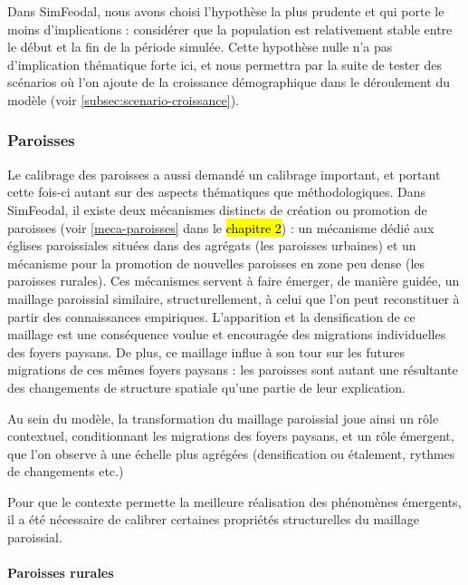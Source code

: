 Dans SimFeodal, nous avons choisi l'hypothèse la plus prudente et qui porte le moins d'implications : considérer que la population est relativement stable entre le début et la fin de la période simulée.
Cette \og hypothèse nulle\fg{} n'a pas d'implication thématique forte ici, et nous permettra par la suite de tester des scénarios où l'on ajoute de la croissance démographique dans le déroulement du modèle (voir \cref{subsec:scenario-croissance}).


\subsubsection*{Paroisses}

Le calibrage des paroisses a aussi demandé un calibrage important, et portant cette fois-ci autant sur des aspects thématiques que méthodologiques.
Dans SimFeodal, il existe deux mécanismes distincts de création ou promotion de paroisses (voir \cref{meca-paroisses} dans le \hl{chapitre 2}) : un mécanisme dédié aux églises paroissiales situées dans des agrégats (les paroisses \og urbaines\fg{}) et un mécanisme pour la promotion de nouvelles paroisses en zone peu dense (les paroisses \og rurales\fg{}).
Ces mécanismes servent à faire émerger, de manière guidée, un maillage paroissial similaire, structurellement, à celui que l'on peut reconstituer à partir des connaissances empiriques.
L'apparition et la densification de ce maillage est une conséquence voulue et encouragée des migrations individuelles des foyers paysans.
De plus, ce maillage influe à son tour sur les futures migrations de ces mêmes foyers paysans : les paroisses sont autant une résultante des changements de structure spatiale qu'une partie de leur explication.

Au sein du modèle, la transformation du maillage paroissial joue ainsi un rôle contextuel, conditionnant les migrations des foyers paysans, et un rôle émergent, que l'on observe à une échelle plus agrégées (densification ou étalement, rythmes de changements etc.)

Pour que le contexte permette la meilleure réalisation des phénomènes émergents, il a été nécessaire de calibrer certaines propriétés structurelles du maillage paroissial.

\paragraph{Paroisses \og rurales\fg{}}

